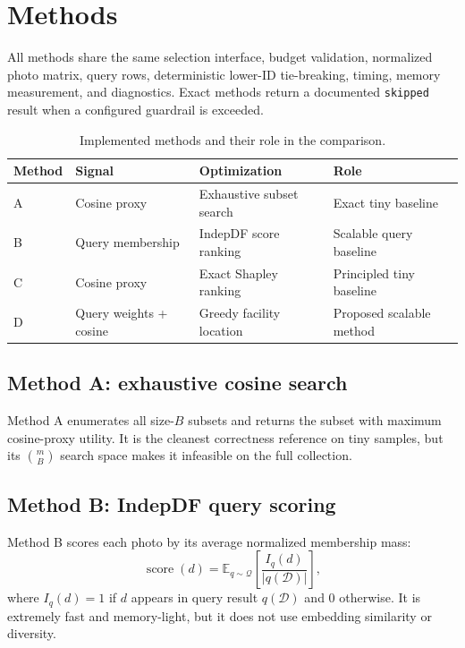 \documentclass[sigconf,nonacm]{acmart}
\newcommand{\dataset}{\mathcal{D}}
\newcommand{\queries}{\mathcal{Q}}
\newcommand{\budget}{B}
\begin{document}
\section{Methods}

All methods share the same selection interface, budget validation, normalized photo matrix, query rows, deterministic lower-ID tie-breaking, timing, memory measurement, and diagnostics. Exact methods return a documented \texttt{skipped} result when a configured guardrail is exceeded.

\begin{table}[!htbp]
  \centering
  \caption{Implemented methods and their role in the comparison.}
  \label{tab:methods}
  \small
  \begin{tabularx}{\textwidth}{@{}lYYY@{}}
    \toprule
    Method & Signal & Optimization & Role \\
    \midrule
    A & Cosine proxy & Exhaustive subset search & Exact tiny baseline \\
    B & Query membership & IndepDF score ranking & Scalable query baseline \\
    C & Cosine proxy & Exact Shapley ranking & Principled tiny baseline \\
    D & Query weights + cosine & Greedy facility location & Proposed scalable method \\
    \bottomrule
  \end{tabularx}
\end{table}

\subsection{Method A: exhaustive cosine search}
Method A enumerates all size-$\budget$ subsets and returns the subset with maximum cosine-proxy utility. It is the cleanest correctness reference on tiny samples, but its $\binom{m}{\budget}$ search space makes it infeasible on the full collection.

\subsection{Method B: IndepDF query scoring}
Method B scores each photo by its average normalized membership mass:
\begin{equation}
  \operatorname{score}(d)
  =
  \mathbb{E}_{q \sim \queries}
  \left[
    \frac{I_q(d)}{|q(\dataset)|}
  \right],
  \label{eq:indepdf}
\end{equation}
where $I_q(d)=1$ if $d$ appears in query result $q(\dataset)$ and $0$ otherwise. It is extremely fast and memory-light, but it does not use embedding similarity or diversity.
\end{document}
